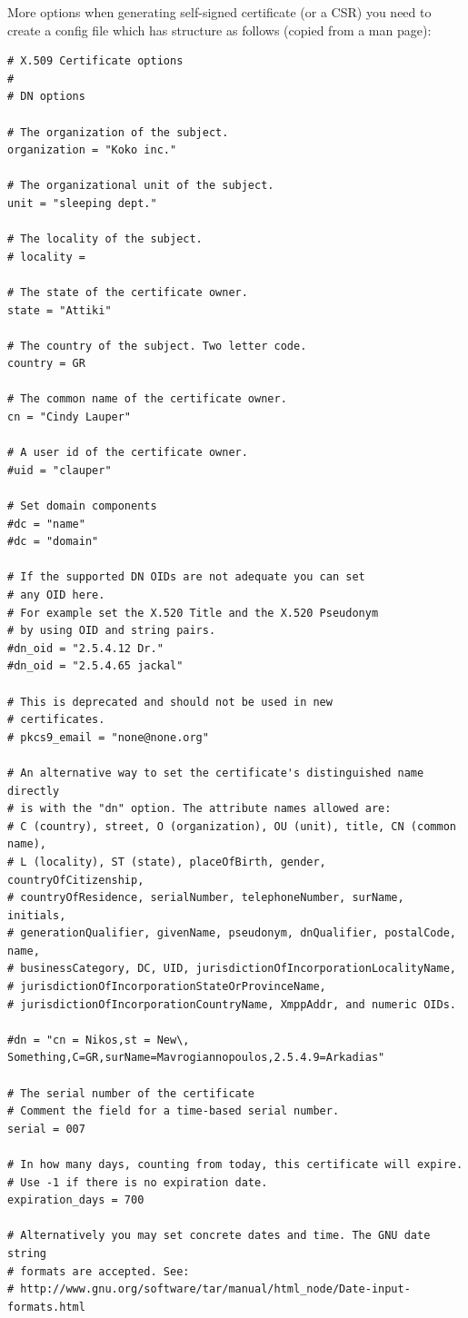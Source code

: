 \documentclass[10pt, a4paper]{report}
\begin{document}
More options when generating self-signed certificate (or a CSR) you need to create a config file which has structure as follows (copied from a man page):
\begin{verbatim}
# X.509 Certificate options
#
# DN options

# The organization of the subject.
organization = "Koko inc."

# The organizational unit of the subject.
unit = "sleeping dept."

# The locality of the subject.
# locality =

# The state of the certificate owner.
state = "Attiki"

# The country of the subject. Two letter code.
country = GR

# The common name of the certificate owner.
cn = "Cindy Lauper"

# A user id of the certificate owner.
#uid = "clauper"

# Set domain components
#dc = "name"
#dc = "domain"

# If the supported DN OIDs are not adequate you can set
# any OID here.
# For example set the X.520 Title and the X.520 Pseudonym
# by using OID and string pairs.
#dn_oid = "2.5.4.12 Dr."
#dn_oid = "2.5.4.65 jackal"

# This is deprecated and should not be used in new
# certificates.
# pkcs9_email = "none@none.org"

# An alternative way to set the certificate's distinguished name directly
# is with the "dn" option. The attribute names allowed are:
# C (country), street, O (organization), OU (unit), title, CN (common name),
# L (locality), ST (state), placeOfBirth, gender, countryOfCitizenship, 
# countryOfResidence, serialNumber, telephoneNumber, surName, initials, 
# generationQualifier, givenName, pseudonym, dnQualifier, postalCode, name, 
# businessCategory, DC, UID, jurisdictionOfIncorporationLocalityName, 
# jurisdictionOfIncorporationStateOrProvinceName,
# jurisdictionOfIncorporationCountryName, XmppAddr, and numeric OIDs.

#dn = "cn = Nikos,st = New\, Something,C=GR,surName=Mavrogiannopoulos,2.5.4.9=Arkadias"

# The serial number of the certificate
# Comment the field for a time-based serial number.
serial = 007

# In how many days, counting from today, this certificate will expire.
# Use -1 if there is no expiration date.
expiration_days = 700

# Alternatively you may set concrete dates and time. The GNU date string 
# formats are accepted. See:
# http://www.gnu.org/software/tar/manual/html_node/Date-input-formats.html


\end{verbatim}
\end{document}
